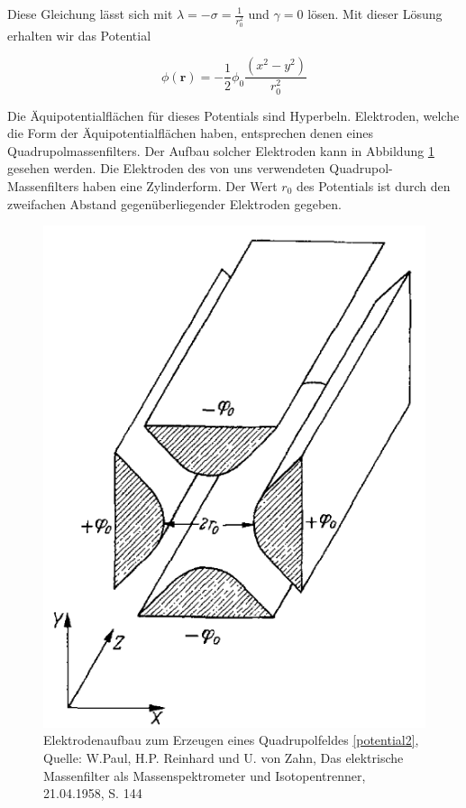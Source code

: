\documentclass[10pt,a4paper]{article}
\begin{document}
Diese Gleichung lässt sich mit $\lambda = - \sigma = \frac{1}{r_0^2}$ und $\gamma = 0$ lösen. Mit dieser Lösung erhalten wir das Potential

\begin{equation}
	\phi (\textbf{r}) = - \frac{1}{2} \phi _0 \frac{(x^2 - y^2)}{r_0^2}
	\label{potential2}
\end{equation}

Die Äquipotentialflächen für dieses Potentials sind Hyperbeln. Elektroden, welche die Form der Äquipotentialflächen haben, entsprechen denen eines Quadrupolmassenfilters. Der Aufbau solcher Elektroden kann in Abbildung \ref{elektrodenform} gesehen werden. Die Elektroden des von uns verwendeten Quadrupol-Massenfilters haben eine Zylinderform. Der Wert $r_0$ des Potentials ist durch den zweifachen Abstand gegenüberliegender Elektroden gegeben.

\begin{figure}[h]
	\centering
	\includegraphics[scale = 0.6]{elektrodenform.png}
	\caption{Elektrodenaufbau zum Erzeugen eines Quadrupolfeldes \eqref{potential2}, Quelle: W.Paul, H.P. Reinhard und U. von Zahn, Das elektrische Massenfilter als Massenspektrometer und Isotopentrenner, 21.04.1958, S. 144}
	\label{elektrodenform}
\end{figure}
\end{document}
